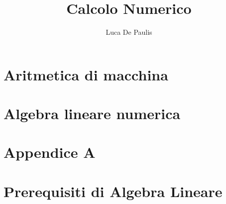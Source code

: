 \documentclass[italian,oneside,headinclude,10pt]{scrbook}
\begin{document}
\author{Luca De Paulis}
\title{Calcolo Numerico}
\maketitle

\tableofcontents

\chapter{Aritmetica di macchina}





\chapter{Algebra lineare numerica}




\appendix
\chapter{Appendice A}

\chapter{Prerequisiti di Algebra Lineare}

\end{document}
